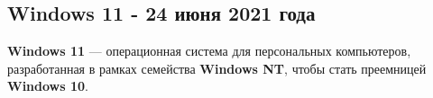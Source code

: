 \documentclass[14pt, a4paper]{article}
\begin{document}
\begin{figure}[h]%
    \centering
    \label{framework} %
\end{figure} \newpage


\begin{centering}
    \subsection*{Windows 11 - 24 июня 2021 года}
\end{centering}

\begin{figure}[h]%
    \centering
    \label{framework} %
\end{figure}


\textbf{Windows 11} — операционная система для персональных компьютеров, разработанная в рамках семейства
\textbf{Windows NT}, чтобы стать преемницей \textbf{Windows 10}.
\end{document}

